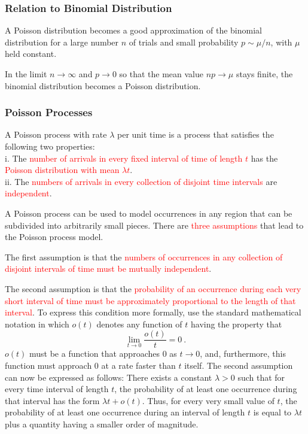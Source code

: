 \documentclass[12pt,a4paper]{article}
\begin{document}
\subsubsection{Relation to Binomial Distribution}
A Poisson distribution becomes a good approximation of the binomial distribution for a large number $n$ of trials and small probability $p \sim \mu/n$, with $\mu$ held constant.

\begin{tcolorbox}[colback=green!15,colframe=green!40!black,title= Theorem]
In the limit $n\rightarrow \infty$ and $p\rightarrow 0$ so that the mean value $np \rightarrow \mu$ stays finite, the binomial distribution becomes a Poisson distribution.
\end{tcolorbox}






\subsubsection{Poisson Processes}
\cite{degroot2012probability} A Poisson process with rate $\lambda$ per unit time is a process that satisfies the following two properties: \\
i. The \textcolor{red}{number of arrivals in every fixed interval of time of length $t$} has the \textcolor{red}{Poisson distribution with mean $\lambda t$}. \\
ii. The \textcolor{red}{numbers of arrivals in every collection of disjoint time intervals} are \textcolor{red}{independent}. 




A Poisson process can be used to model occurrences in any region that can be subdivided into arbitrarily small pieces. There are \textcolor{red}{three assumptions} that lead to the Poisson process model.

The first assumption is that the \textcolor{red}{numbers of occurrences in any collection of disjoint intervals of time must be mutually independent}. 

The second assumption is that the \textcolor{red}{probability of an occurrence during each very short interval of time must be approximately proportional to the length of that interval}. To express this condition more formally, use the standard mathematical notation in which $o(t)$ denotes any function of $t$ having the property that
\begin{equation}
\underset{t\rightarrow 0}\lim \dfrac{o(t)}{t}  = 0 ~.
\end{equation}
$o(t)$ must be a function that approaches $0$ as $t \rightarrow 0$, and, furthermore, this function must approach $0$ at a rate faster than $t$ itself. The second assumption can now be expressed as follows: There exists a constant $\lambda > 0$ such that for every time interval of length $t$, the probability of at least one occurrence during that interval has the form $\lambda t + o(t)$. Thus, for every very small value of $t$, the probability of at least one occurrence during an interval of length $t$ is equal to $\lambda t$ plus a quantity having a smaller order of magnitude.
\end{document}
